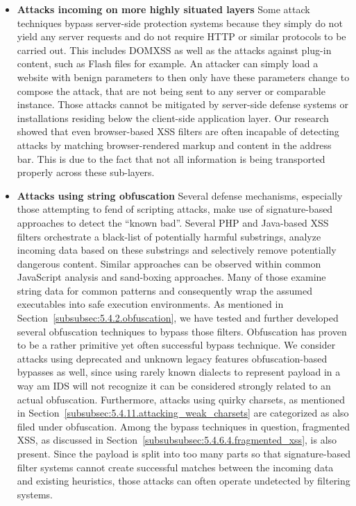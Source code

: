 \begin{itemize}
 \item \textbf{Attacks incoming on more highly situated layers} Some attack techniques bypass server-side protection systems because they simply do not yield any server requests and do not require HTTP or similar protocols to be carried out. This includes DOMXSS as well as the attacks against plug-in content, such as Flash files for example. An attacker can simply load a website with benign parameters to then only have these parameters change to compose the attack, that are not being sent to any server or comparable instance. Those attacks cannot be mitigated by server-side defense systems or installations residing below the client-side application layer. Our research showed that even browser-based XSS filters are often incapable of detecting attacks by matching browser-rendered markup and content in the address bar. This is due to the fact that not all information is being transported properly across these sub-layers.
 \item \textbf{Attacks using string obfuscation} Several defense mechanisms, especially those attempting to fend of scripting attacks, make use of signature-based approaches to detect the ``known bad''. Several PHP and Java-based XSS filters orchestrate a black-list of potentially harmful substrings, analyze incoming data based on these substrings and selectively remove potentially dangerous content. Similar approaches can be observed within common JavaScript analysis and sand-boxing approaches. Many of those examine string data for common patterns and consequently wrap the assumed executables into safe execution environments. As mentioned in Section~\ref{subsubsec:5.4.2.obfuscation}, we have tested and further developed several obfuscation techniques to bypass those filters. Obfuscation has proven to be a rather primitive yet often successful bypass technique. We consider attacks using deprecated and unknown legacy features obfuscation-based bypasses as well, since using rarely known dialects to represent 
payload in a way am IDS will not recognize it can be considered strongly related to an actual obfuscation. Furthermore, attacks using quirky charsets, as mentioned in Section~\ref{subsubsec:5.4.11.attacking_weak_charsets} are categorized as also filed under obfuscation. Among the bypass techniques in question, fragmented XSS, as discussed in Section~\ref{subsubsubsec:5.4.6.4.fragmented_xss}, is also present. Since the payload is split into too many parts so that signature-based filter systems cannot create successful matches between the incoming data and existing heuristics, those attacks can often operate undetected by filtering systems.

\end{itemize}
